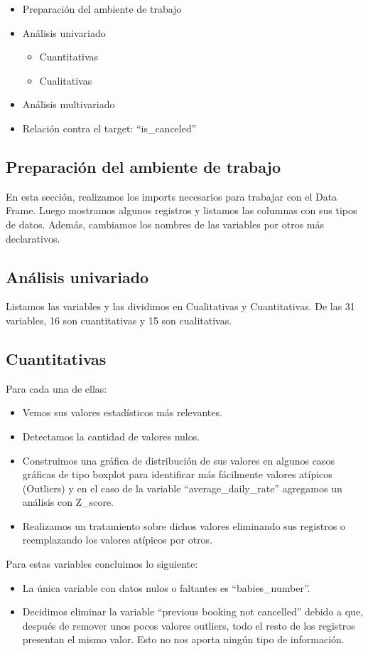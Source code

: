 \documentclass{article}
\begin{document}
\begin{itemize}
	\item Preparación del ambiente de trabajo
	\item Análisis univariado
	\begin{itemize}
		\item Cuantitativas
		\item Cualitativas
	\end{itemize}
	\item Análisis multivariado
	\item Relación contra el target: “is\_canceled”
\end{itemize}
\subsection*{Preparación del ambiente de trabajo}
En esta sección, realizamos los imports necesarios para trabajar con el Data Frame. Luego mostramos algunos registros y listamos las columnas con sus tipos de datos. Además, cambiamos los nombres de las variables por otros más declarativos.

\subsection*{Análisis univariado}
Listamos las variables y las dividimos en Cualitativas y Cuantitativas. De las 31 variables, 16 son cuantitativas y 15 son cualitativas.
\subsection*{Cuantitativas}
Para cada una de ellas:
\begin{itemize}
	\item Vemos sus valores estadísticos más relevantes.
	\item Detectamos la cantidad de valores nulos.
	\item Construimos una gráfica de distribución de sus valores en algunos casos gráficas de tipo boxplot para identificar más fácilmente valores atípicos (Outliers) y en el caso de la variable “average\_daily\_rate” agregamos un análisis con Z\_score.
	\item Realizamos un tratamiento sobre dichos valores eliminando sus registros o reemplazando los valores atípicos por otros.
\end{itemize} 
Para estas variables concluimos lo siguiente:
\begin{itemize}
	\item La única variable con datos nulos o faltantes es “babies\_number”.
	\item  Decidimos eliminar la variable “previous booking not cancelled” debido a que, después de remover unos pocos valores outliers, todo el resto de los registros presentan el mismo valor. Esto no nos aporta ningún tipo de información.
\end{itemize}
\end{document}
